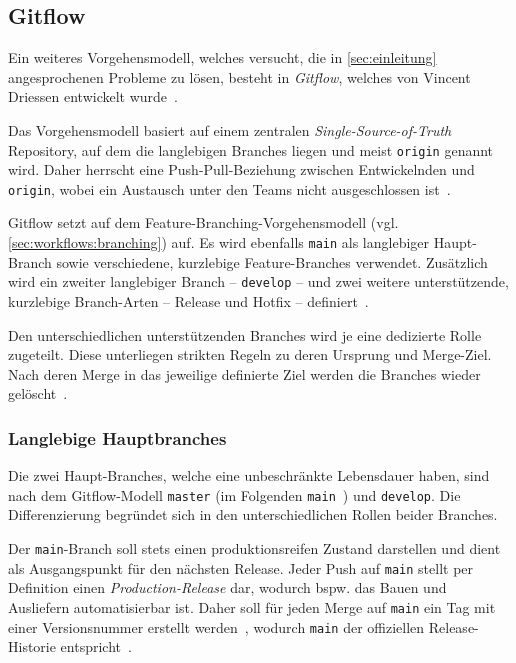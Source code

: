 
\subsection{Gitflow}
\label{sec:workflows:gitflow}

Ein weiteres Vorgehensmodell, welches versucht, die in \autoref{sec:einleitung} angesprochenen Probleme zu lösen, besteht in \emph{Gitflow}, welches \citeyear{driessenSuccessfulGitBranching2010} von Vincent Driessen entwickelt wurde~\cite{driessenSuccessfulGitBranching2010}.

Das Vorgehensmodell basiert auf einem zentralen \emph{Single\hyp Source\hyp of\hyp Truth} Repository, auf dem die langlebigen Branches liegen und meist \texttt{origin} genannt wird. Daher herrscht eine Push\hyp Pull\hyp Beziehung zwischen Entwickelnden und \texttt{origin}, wobei ein Austausch unter den Teams nicht ausgeschlossen ist~\cite{driessenSuccessfulGitBranching2010}.

Gitflow setzt auf dem Feature\hyp Branching\hyp Vorgehensmodell (vgl. \autoref{sec:workflows:branching}) auf. Es wird ebenfalls \texttt{main} als langlebiger Haupt\hyp Branch sowie verschiedene, kurzlebige Feature\hyp Branches verwendet. Zusätzlich wird ein zweiter langlebiger Branch -- \texttt{develop} -- und zwei weitere unterstützende, kurzlebige Branch\hyp Arten -- Release und Hotfix -- definiert~\cite{driessenSuccessfulGitBranching2010}.

Den unterschiedlichen unterstützenden Branches wird je eine dedizierte Rolle zugeteilt. Diese unterliegen strikten Regeln zu deren Ursprung und Merge\hyp Ziel. Nach deren Merge in das jeweilige definierte Ziel werden die Branches wieder gelöscht~\cite{driessenSuccessfulGitBranching2010}.


\subsubsection{Langlebige Hauptbranches}

Die zwei Haupt\hyp Branches, welche eine unbeschränkte Lebensdauer haben, sind nach dem Gitflow\hyp Modell \texttt{master} (im Folgenden \texttt{main}~\cite{githubincRenamingDefaultBranch2022,softwarefreedomconservancyRegardingGitBranch2020}) und \texttt{develop}. Die Differenzierung begründet sich in den unterschiedlichen Rollen beider Branches.

Der \texttt{main}-Branch soll stets einen produktionsreifen Zustand darstellen und dient als Ausgangspunkt für den nächsten Release. Jeder Push auf \texttt{main} stellt per Definition einen \emph{Production-Release} dar, wodurch bspw. das Bauen und Ausliefern automatisierbar ist. Daher soll für jeden Merge auf \texttt{main} ein Tag mit einer Versionsnummer erstellt werden~\cite{driessenSuccessfulGitBranching2010}, wodurch \texttt{main} der offiziellen Release\hyp Historie entspricht~\cite{atlassianGitflowWorkflow}.


